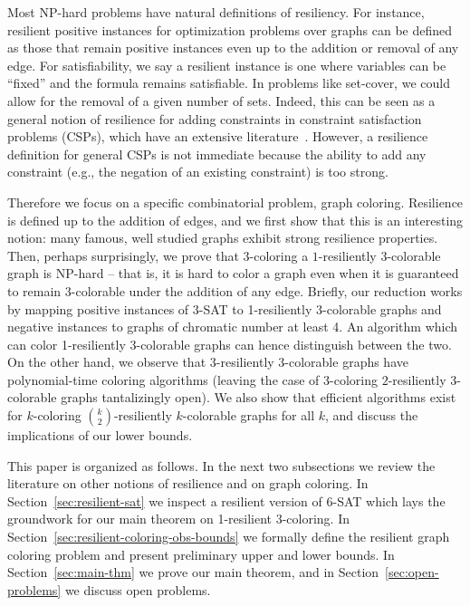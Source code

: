 \documentclass{llncs}
\begin{document}
Most NP-hard problems have natural definitions of resiliency.  For instance,
resilient positive instances for optimization problems over graphs can be
defined as those that remain positive instances even up to the addition or
removal of any edge.  For satisfiability, we say a resilient instance is one
where variables can be ``fixed'' and the formula remains satisfiable. In
problems like set-cover, we could allow for the removal of a given number of
sets. Indeed, this can be seen as a general notion of resilience for adding
constraints in constraint satisfaction problems (CSPs), which have an extensive
literature~\cite{Kumar92}. However, a resilience definition for general CSPs
is not immediate because the ability to add any constraint (e.g., the negation
of an existing constraint) is too strong.

Therefore we focus on a specific combinatorial problem, graph coloring.
Resilience is defined up to the addition of edges, and we first show that this
is an interesting notion: many famous, well studied graphs exhibit strong
resilience properties. Then, perhaps surprisingly, we prove that $3$-coloring a
$1$-resiliently 3-colorable graph is NP-hard -- that is, it is hard to color a
graph even when it is guaranteed to remain $3$-colorable under the addition of
any edge. Briefly, our reduction works by mapping positive instances of 3-SAT
to 1-resiliently 3-colorable graphs and negative instances to graphs of
chromatic number at least 4. An algorithm which can color 1-resiliently
3-colorable graphs can hence distinguish between the two. On the other hand, we
observe that $3$-resiliently $3$-colorable graphs have polynomial-time coloring
algorithms (leaving the case of 3-coloring $2$-resiliently $3$-colorable graphs
tantalizingly open). We also show that efficient algorithms exist for
$k$-coloring $\binom{k}{2}$-resiliently $k$-colorable graphs for all $k$, and
discuss the implications of our lower bounds. 

This paper is organized as follows. In the next two subsections we review the
literature on other notions of resilience and on graph coloring. In
Section~\ref{sec:resilient-sat} we inspect a resilient version of 6-SAT which
lays the groundwork for our main theorem on 1-resilient 3-coloring. In
Section~\ref{sec:resilient-coloring-obs-bounds} we formally define the resilient
graph coloring problem and present preliminary upper and lower bounds. In
Section~\ref{sec:main-thm} we prove our main theorem, and in
Section~\ref{sec:open-problems} we discuss open problems.
\end{document}
